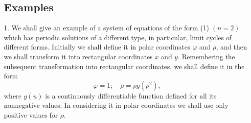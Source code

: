 \documentclass[10pt,a5paper]{book}
\theoremstyle{plain}
\theoremstyle{definition}
\theoremstyle{remark}
\begin{document}
\subsection*{Examples}
1. We shall give an example of a system of equations of the form (1) $(n=2)$ which has periodic solutions of a different type, in particular, limit cycles of different forms. Initially we shall define it in polar coordinates $\varphi$ and $\rho$, and then we shall transform it into rectangular coordinates $x$ and $y$. Remembering the subsequent transformation into
rectangular coordinates, we shall define it in the form
\begin{equation*}
\dot{\varphi}=1 ; \quad \dot{\rho}=\rho g\left(\rho^{2}\right), \tag{18}
\end{equation*}
where $g(u)$ is a continuously differentiable function defined for all its nonnegative values. In considering it in polar coordinates we shall use only positive values for $\rho$.
\end{document}
